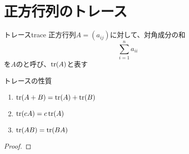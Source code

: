 \documentclass[../../../topic_linear-algebra]{subfiles}
\begin{document}
\sectionline
\section{正方行列のトレース}

\begin{definition}{トレース}{trace}
  正方行列$A=(a_{ij})$に対して、対角成分の和
  \begin{equation*}
    \sum_{i=1}^n a_{ii}
  \end{equation*}
  を$A$のと呼び、$\tr(A)$と表す
\end{definition}

\begin{theorem*}{トレースの性質}
  \begin{enumerate}[label=\romanlabel]
    \item $\tr(A+B) = \tr(A) + \tr(B)$
    \item $\tr(cA) = c\tr(A)$
    \item $\tr(AB) = \tr(BA)$
  \end{enumerate}
\end{theorem*}

\begin{proof}
\end{proof}
\end{document}
